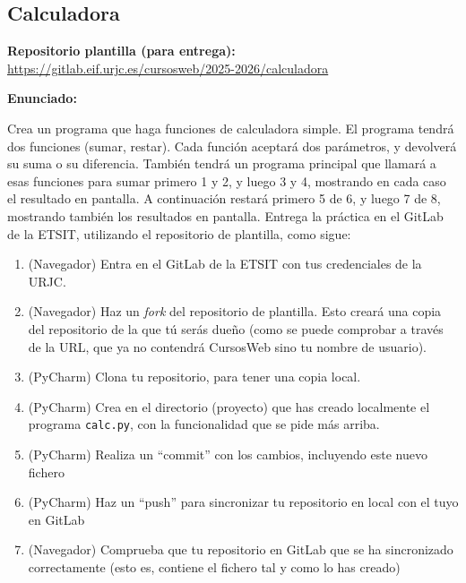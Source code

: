 \subsection{Calculadora}
\label{subsec:calculadora}

\textbf{Repositorio plantilla (para entrega):} \\
\url{https://gitlab.eif.urjc.es/cursosweb/2025-2026/calculadora}

\textbf{Enunciado:}

Crea un programa que haga funciones de calculadora simple. El programa tendrá dos funciones (sumar, restar). Cada función aceptará dos parámetros, y devolverá su suma o su diferencia. También tendrá un programa principal que llamará a esas funciones para sumar primero 1 y 2, y luego 3 y 4, mostrando en cada caso el resultado en pantalla. A continuación restará primero 5 de 6, y luego 7 de 8, mostrando también los resultados en pantalla. Entrega la práctica en el GitLab de la ETSIT, utilizando el repositorio de plantilla, como sigue:

\begin{enumerate}
  \item (Navegador) Entra en el GitLab de la ETSIT con tus credenciales de la URJC.
  \item (Navegador) Haz un \emph{fork} del repositorio de plantilla. Esto creará una copia del repositorio de la que tú serás dueño (como se puede comprobar a través de la URL, que ya no contendrá CursosWeb sino tu nombre de usuario).
  \item (PyCharm) Clona tu repositorio, para tener una copia local.
  \item (PyCharm) Crea en el directorio (proyecto) que has creado localmente el programa \texttt{calc.py}, con la funcionalidad que se pide más arriba.
  \item (PyCharm) Realiza un ``commit'' con los cambios, incluyendo este nuevo fichero
  \item (PyCharm) Haz un ``push'' para sincronizar tu repositorio en local con el tuyo en GitLab
  \item (Navegador) Comprueba que tu repositorio en GitLab que se ha sincronizado correctamente (esto es, contiene el fichero tal y como lo has creado)
\end{enumerate}


